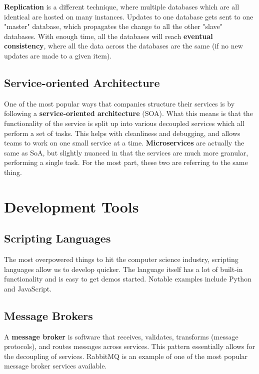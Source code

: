 \documentclass{report}
\newcommand{\npar}{\par\noindent}
\newcommand{\vpar}{\vspace{1em}\npar}
\begin{document}
\vpar \textbf{Replication} is a different technique, where multiple databases which are all identical are hosted on many instances. Updates to one database gets sent to one "master" database, which propagates the change to all the other "slave" databases. With enough time, all the databases will reach \textbf{eventual consistency}, where all the data across the databases are the same (if no new updates are made to a given item).

\newpage
\section{Service-oriented Architecture}

\par One of the most popular ways that companies structure their services is by following a \textbf{service-oriented architecture} (SOA). What this means is that the functionality of the service is split up into various decoupled services which all perform a set of tasks. This helps with cleanliness and debugging, and allows teams to work on one small service at a time. \textbf{Microservices} are actually the same as SoA, but slightly nuanced in that the services are much more granular, performing a single task. For the most part, these two are referring to the same thing.

\chapter{Development Tools}

\section{Scripting Languages}

\par The most overpowered things to hit the computer science industry, scripting languages allow us to develop quicker. The language itself has a lot of built-in functionality and is easy to get demos started. Notable examples include Python and JavaScript.

\section{Message Brokers}

\par A \textbf{message broker} is software that receives, validates, transforms (message protocols), and routes messages across services. This pattern essentially allows for the decoupling of services. RabbitMQ is an example of one of the most popular message broker services available.
\end{document}
